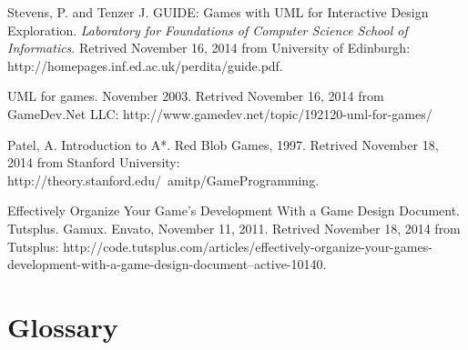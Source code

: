 \documentclass[12pt]{article}       %
\begin{document}
\begin{thebibliography}{99}
 Stevens, P. and Tenzer J. GUIDE: Games with UML for Interactive Design Exploration. 
{ \it Laboratory for Foundations of Computer Science School of Informatics}. Retrived November 16, 2014 from University of Edinburgh: http://homepages.inf.ed.ac.uk/perdita/guide.pdf.

 UML for games. November 2003. Retrived November 16, 2014 from GameDev.Net LLC: http://www.gamedev.net/topic/192120-uml-for-games/

 Patel, A. Introduction to A*. Red Blob Games, 1997. Retrived November 18, 2014 from Stanford University: http://theory.stanford.edu/~amitp/GameProgramming.
 
 Effectively Organize Your Game's Development With a Game Design Document. Tutsplus. Gamux. Envato, November 11, 2011. Retrived November 18, 2014 from Tutsplus: http://code.tutsplus.com/articles/effectively-organize-your-games-development-with-a-game-design-document--active-10140. 


\end{thebibliography}

\newpage

\section{Glossary}
\label{sec:gloss}
\end{document}
